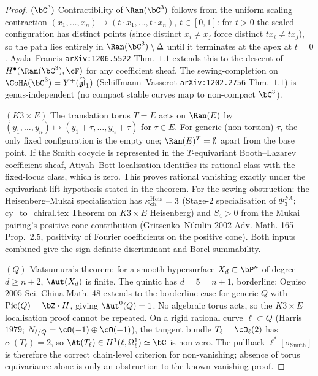 \begin{proof}
$(\bC^3)$ Contractibility of $\Ran(\bC^3)$ follows from the uniform
scaling contraction $(x_1, \dots, x_n) \mapsto (t \cdot x_1, \dots,
t \cdot x_n)$, $t \in [0, 1]$: for $t > 0$ the scaled configuration
has distinct points (since distinct $x_i \neq x_j$ force distinct
$t x_i \neq t x_j$), so the path lies entirely in
$\Ran(\bC^3) \setminus \Delta$ until it terminates at the apex at
$t = 0$. Ayala--Francis \texttt{arXiv:1206.5522} Thm.~$1.1$ extends
this to the descent of $H^\bullet(\Ran(\bC^3), \cF)$ for any
coefficient sheaf. The sewing-completion on $\CoHA(\bC^3) =
Y^+(\widehat{\mathfrak{gl}}_1)$ (Schiffmann--Vasserot
\texttt{arXiv:1202.2756} Thm.~$1.1$) is genus-independent (no
compact stable curves map to non-compact $\bC^3$).

$(K3 \times E)$ The translation torus $T = E$ acts on $\Ran(E)$ by
$(y_1, \dots, y_n) \mapsto (y_1 + \tau, \dots, y_n + \tau)$ for
$\tau \in E$. For generic (non-torsion) $\tau$, the only fixed
configuration is the empty one; $\Ran(E)^T = \emptyset$ apart from
the base point. If the Smith cocycle is represented in the
$T$-equivariant Booth--Lazarev coefficient sheaf, Atiyah--Bott
localisation identifies its rational class with the fixed-locus class,
which is zero. This proves rational vanishing exactly under the
equivariant-lift hypothesis stated in the theorem. For the sewing
obstruction:
the Heisenberg--Mukai specialisation has $\kappa_{\mathrm{ch}}^{\mathrm{Heis}} = 3$
(Stage-$2$ specialisation of $\Phi^{FA}_3$; cy\_to\_chiral.tex
Theorem on $K3 \times E$ Heisenberg) and $S_4 > 0$ from the
Mukai pairing's positive-cone contribution (Gritsenko--Nikulin
$2002$ Adv. Math. 165 Prop.~$2.5$, positivity of Fourier
coefficients on the positive cone). Both inputs combined give the
sign-definite discriminant and Borel summability.

$(Q)$ Matsumura's theorem: for a smooth hypersurface $X_d \subset
\bP^n$ of degree $d \geq n + 2$, $\Aut(X_d)$ is finite. The quintic
has $d = 5 = n + 1$, borderline; Oguiso $2005$ Sci. China Math. 48
extends to the borderline case for generic $Q$ with
$\mathrm{Pic}(Q) = \bZ \cdot H$, giving $\Aut^0(Q) = 1$. No algebraic
torus acts, so the $K3\times E$ localisation proof cannot be repeated.
On a rigid rational curve $\ell \subset Q$ (Harris $1979$;
$N_{\ell/Q} = \cO(-1) \oplus \cO(-1)$), the tangent bundle
$T_\ell=\cO_\ell(2)$ has $c_1(T_\ell)=2$, so
$\At(T_\ell)\in H^1(\ell,\Omega^1_\ell)\simeq\bC$ is non-zero. The
pullback $\ell^*[\sigma_{\mathrm{Smith}}]$ is therefore the correct
chain-level criterion for non-vanishing; absence of torus equivariance alone
is only an obstruction to the known vanishing proof.


\end{proof}
